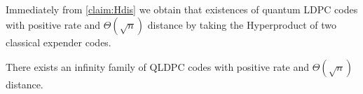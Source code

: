 Immediately from \cref{claim:Hdis} we obtain that existences of quantum LDPC codes with positive rate and $\Theta\left( \sqrt{n} \right)$ distance by taking the Hyperproduct of two classical expender codes.   

\begin{theorem}
  There exists an infinity family of QLDPC codes with positive rate and $\Theta(\sqrt{n})$ distance.   
\end{theorem}

%




